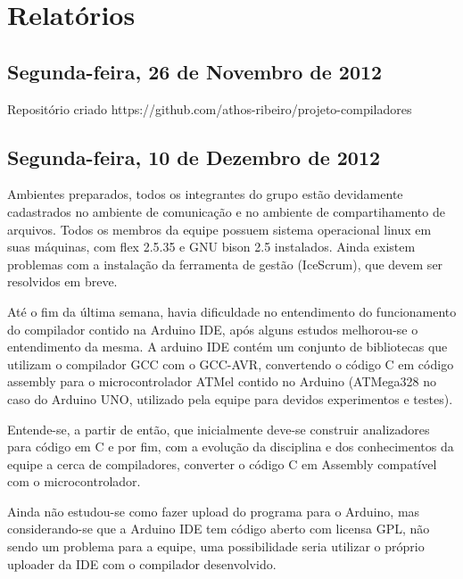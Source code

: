 \documentclass{abnt}
\begin{document}
\chapter{Relatórios}
\section{Segunda-feira, 26 de Novembro de 2012}
Repositório criado
    https://github.com/athos-ribeiro/projeto-compiladores
    \section{Segunda-feira, 10 de Dezembro de 2012}
    Ambientes preparados, todos os integrantes do grupo estão devidamente cadastrados no ambiente de comunicação e no ambiente de compartihamento de arquivos.
    Todos os membros da equipe possuem sistema operacional linux em suas máquinas, com flex 2.5.35 e GNU bison 2.5 instalados. Ainda existem problemas com a instalação da ferramenta de gestão (IceScrum), que devem ser resolvidos em breve.

    Até o fim da última semana, havia dificuldade no entendimento do funcionamento do compilador contido na Arduino IDE, após alguns estudos melhorou-se o entendimento da mesma.
    A arduino IDE contém um conjunto de bibliotecas que utilizam o compilador GCC com o GCC-AVR, convertendo o código C em código assembly para o microcontrolador ATMel contido no Arduino (ATMega328 no caso do Arduino UNO, utilizado pela equipe para devidos experimentos e testes).

    Entende-se, a partir de então, que inicialmente deve-se construir analizadores para código em C e por fim, com a evolução da disciplina e dos conhecimentos da equipe a cerca de compiladores, converter o código C em Assembly compatível com o microcontrolador.

    Ainda não estudou-se como fazer upload do programa para o Arduino, mas considerando-se que a Arduino IDE tem código aberto com licensa GPL, não sendo um problema para a equipe, uma possibilidade seria utilizar o próprio uploader da IDE com o compilador desenvolvido.
\end{document}
